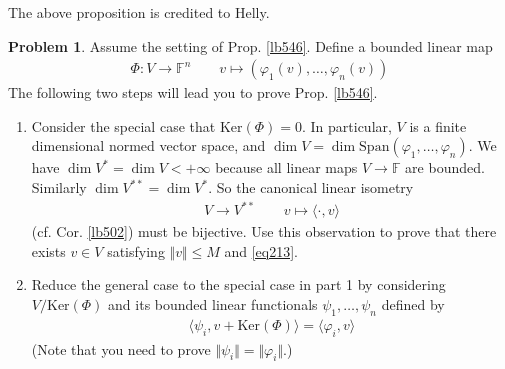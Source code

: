 \documentclass[12pt,b5paper,notitlepage]{article}
\theoremstyle{definition}
\newtheorem{prob}{\color{red}Problem}[section]
\theoremstyle{plain}
\newcommand{\Span}{\mathrm{Span}}
\newcommand{\bk}[1]{\langle {#1}\rangle}
\newcommand{\Ker}{\mathrm{Ker}}
\newcommand{\Fbb}{\mathbb F}
\numberwithin{equation}{section}
\begin{document}
The above proposition is credited to Helly.

\begin{prob}\label{lb547}
Assume the setting of Prop. \ref{lb546}. Define a bounded linear map
\begin{gather}\label{eq214}
\Phi:V\rightarrow \Fbb^n\qquad v\mapsto(\varphi_1(v),\dots,\varphi_n(v))
\end{gather}
The following two steps will lead you to prove Prop. \ref{lb546}.
\begin{enumerate}
\item Consider the special case that $\Ker(\Phi)=0$. In particular, $V$ is a finite dimensional normed vector space, and $\dim V=\dim\Span(\varphi_1,\dots,\varphi_n)$. We have $\dim V^*=\dim V<+\infty$ because all linear maps $V\rightarrow\Fbb$ are bounded. Similarly $\dim V^{**}=\dim V^*$. So the canonical linear isometry
\begin{gather}
V\rightarrow V^{**}\qquad v\mapsto \bk{\cdot,v}
\end{gather}
(cf. Cor. \ref{lb502}) must be bijective. Use this observation to prove that there exists $v\in V$ satisfying $\Vert v\Vert\leq M$ and \eqref{eq213}.

\item Reduce the general case to the special case in part 1 by considering $V/\Ker(\Phi)$ and its bounded linear functionals $\psi_1,\dots,\psi_n$ defined by
\begin{align}
\bk{\psi_i,v+\Ker(\Phi)}=\bk{\varphi_i,v}
\end{align}
(Note that you need to prove $\Vert\psi_i\Vert=\Vert\varphi_i\Vert$.)
\end{enumerate}
\end{prob}
\end{document}
